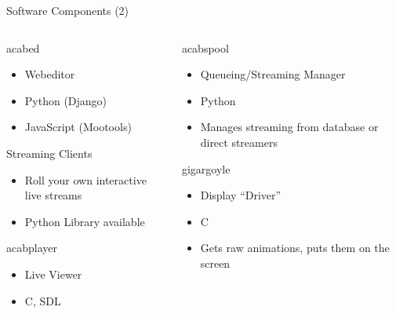 \documentclass{beamer}
\begin{document}
\begin{frame}{Software Components (2)}
    \begin{columns}
	\begin{column}{5cm}
	    \begin{block}{acabed}
		\begin{itemize}
		    \item Webeditor
		    \item Python (Django)
		    \item JavaScript (Mootools)
		\end{itemize}
	    \end{block}
	    \begin{block}{Streaming Clients}
		\begin{itemize}
		    \item Roll your own interactive live streams
		    \item Python Library available
		\end{itemize}
	    \end{block}
	    \begin{block}{acabplayer}
		\begin{itemize}
		    \item Live Viewer
		    \item C, SDL
		\end{itemize}
	    \end{block}
	\end{column}
	\begin{column}{5cm}
	    \begin{block}{acabspool}
		\begin{itemize}
			\item Queueing/Streaming Manager
			\item Python
			\item Manages streaming from
			    database or direct streamers
		\end{itemize}
	    \end{block}
	    \begin{block}{gigargoyle}
		\begin{itemize}
		    \item Display ``Driver''
		    \item C
		    \item Gets raw animations, puts them on the screen
		\end{itemize}
	    \end{block}
	\end{column}
    \end{columns}
\end{frame}
\end{document}
